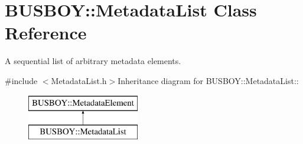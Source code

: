 \hypertarget{classBUSBOY_1_1MetadataList}{
\section{BUSBOY::MetadataList Class Reference}
\label{classBUSBOY_1_1MetadataList}
}


A sequential list of arbitrary metadata elements.  


{\ttfamily \#include $<$MetadataList.h$>$}Inheritance diagram for BUSBOY::MetadataList::\begin{figure}[H]
\begin{center}
\leavevmode
\includegraphics[height=2cm]{classBUSBOY_1_1MetadataList}
\end{center}
\end{figure}
